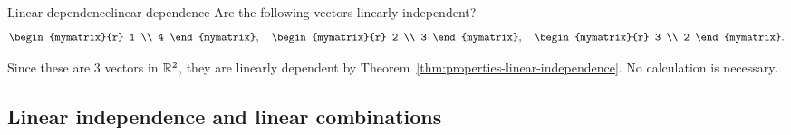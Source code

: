 \begin{example}{Linear dependence}{linear-dependence}
  Are the following vectors linearly independent?
  \begin{equation*}
    \begin{mymatrix}{r}
        1 \\
        4 
      \end{mymatrix},\quad 
      \begin{mymatrix}{r}
        2 \\
        3
      \end{mymatrix},\quad
      \begin{mymatrix}{r}
        3 \\
        2
      \end{mymatrix}.
  \end{equation*}
\end{example}

\begin{solution}
  Since these are $3$ vectors in $\mathbb{R}^2$, they are linearly dependent
  by Theorem~\ref{thm:properties-linear-independence}. No calculation
  is necessary.
\end{solution}

\subsection{Linear independence and linear combinations}


